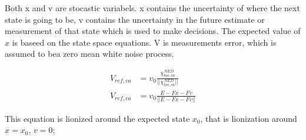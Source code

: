 Both x and v are stocastic variabels. x contains the uncertainty of where the next state is going to be, v contains the uncertainty in the future estimate or measurement of that state which is used to make decisions. The expected value of $x$ is baseed on the state space equations. V is measurements error, which is assumed to bea  zero mean white noise process.

\begin{align}
        V_{ref,ca} & = v_0 \frac{\chi^{NED}_{los,ca} }{|| \chi^{NED}_{los,ca} ||} \\
        V_{ref,ca} & = v_0 \frac{E - F x - F v }{|| E - F x - F v ||}
\end{align}

This equation is lionized around the expected state $x_0$, that is lionization around $x=x_0$, $v=0$;
